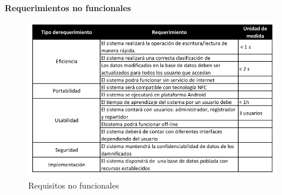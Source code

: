 \documentclass[11pt,openany]{book}
\begin{document}
	\newpage

	\textbf{Requerimientos no funcionales}
	
	\begin{figure}[htb]
			\centering
			\includegraphics[width=1\textwidth]{imagenes/requerimientos_no_funcionales.PNG}
			\caption{Requisitos no funcionales}
			\label{Requisitos_no_funcionales}
	\end{figure}
\end{document}
